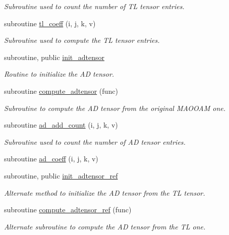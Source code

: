 \begin{DoxyCompactItemize}
\begin{DoxyCompactList}\small\item\em Subroutine used to count the number of TL tensor entries. \end{DoxyCompactList}\item 
subroutine \hyperlink{namespacetl__ad__tensor_a0e37e78de771af0205bd80a30c911a68}{tl\+\_\+coeff} (i, j, k, v)
\begin{DoxyCompactList}\small\item\em Subroutine used to compute the TL tensor entries. \end{DoxyCompactList}\item 
subroutine, public \hyperlink{namespacetl__ad__tensor_a199cc07a7172f6cf662f9a5bd6f3d45c}{init\+\_\+adtensor}
\begin{DoxyCompactList}\small\item\em Routine to initialize the AD tensor. \end{DoxyCompactList}\item 
subroutine \hyperlink{namespacetl__ad__tensor_a9437eafe79ee3b0b89cd67af4956fba0}{compute\+\_\+adtensor} (func)
\begin{DoxyCompactList}\small\item\em Subroutine to compute the AD tensor from the original M\+A\+O\+O\+AM one. \end{DoxyCompactList}\item 
subroutine \hyperlink{namespacetl__ad__tensor_a0ba0f9d4f9182a49209483749b6d5e10}{ad\+\_\+add\+\_\+count} (i, j, k, v)
\begin{DoxyCompactList}\small\item\em Subroutine used to count the number of AD tensor entries. \end{DoxyCompactList}\item 
subroutine \hyperlink{namespacetl__ad__tensor_a177e8f1ebac5de029f565ef7624926f2}{ad\+\_\+coeff} (i, j, k, v)
\item 
subroutine, public \hyperlink{namespacetl__ad__tensor_a3b666898a684bf3f2e932f38616fc920}{init\+\_\+adtensor\+\_\+ref}
\begin{DoxyCompactList}\small\item\em Alternate method to initialize the AD tensor from the TL tensor. \end{DoxyCompactList}\item 
subroutine \hyperlink{namespacetl__ad__tensor_a154e946ce2d6720a48a675ba92a7f350}{compute\+\_\+adtensor\+\_\+ref} (func)
\begin{DoxyCompactList}\small\item\em Alternate subroutine to compute the AD tensor from the TL one. \end{DoxyCompactList}\item 

\end{DoxyCompactItemize}
